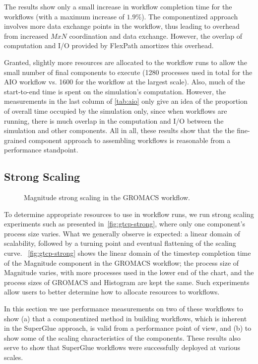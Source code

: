 The results show only a small increase in
workflow completion time for the \sys
workflows (with a maximum increase of $1.9 \%$).
The componentized
approach involves more data exchange points
in the workflow, thus leading to
overhead from increased $MxN$ coordination and data exchange.
However, the overlap of computation and I/O provided by FlexPath
amortizes this overhead.

Granted, slightly more resources are allocated to the
\sys workflow runs to allow the small number
of final components to execute (1280 processes
used in total for the AIO workflow vs. 1600 for
the \sys workflow at the largest scale).
Also, much of the start-to-end time is spent on
the simulation's computation.
However, the measurements in the last column
of \autoref{tab:aio}
only give an idea of the proportion of 
overall time occupied by the simulation only,
since when workflows are running, there is much
overlap in the computation and I/O between the
simulation and other components. All in all,
these results show that the 
the fine-grained component approach
to assembling workflows
is reasonable from a performance standpoint.

\subsection{Strong Scaling}
\begin{figure}
  \centering
  \vspace{-0.08in}
  
  \vspace{-0.12in}
  \caption{Magnitude strong scaling in the GROMACS workflow.}
  \label{fig:gtcp-strong}
  \vspace{-0.25in}
\end{figure}
To determine appropriate resources
to use in workflow runs,
we run strong scaling experiments such
as presented in~\autoref{fig:gtcp-strong},
where only one component's process size
varies.
What we generally observe is expected: a linear domain of
scalability, followed by a turning point
and eventual flattening of the scaling curve.
~\autoref{fig:gtcp-strong} shows the
linear domain of the timestep
completion time of the Magnitude component
in the GROMACS workflow; the process size of Magnitude
varies, with more processes used in the lower
end of the chart, and the process sizes of
GROMACS and Histogram are kept the same.
Such experiments allow users
to better determine how to allocate resources to \sys workflows.

In this section we use
performance measurements on two of these workflows
to show (a) that a componentized method in
building workflows, which is inherent in the SuperGlue approach,
is valid from a performance point of view,
and (b) to show some of the scaling characteristics
of the components.
These results also serve to show that
SuperGlue workflows were successfully
deployed at various
scales.

